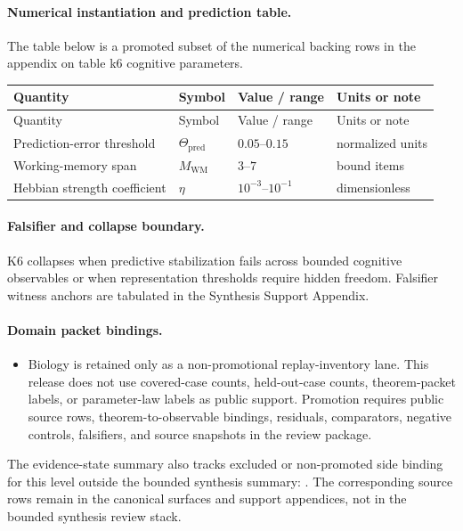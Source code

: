 \paragraph{Numerical instantiation and prediction table.}
The table below is a promoted subset of the numerical backing rows in the appendix on table k6 cognitive parameters.
\begin{longtable}{@{}L{0.27\textwidth}L{0.15\textwidth}L{0.24\textwidth}L{0.16\textwidth}@{}}
\toprule
Quantity & Symbol & Value / range & Units or note \\
\midrule
\endfirsthead
\toprule
Quantity & Symbol & Value / range & Units or note \\
\midrule
\endhead
Prediction-error threshold & $\scriptstyle \Theta_{\mathrm{pred}}$ & $0.05\text{--}0.15$ & normalized units \\
Working-memory span & $\scriptstyle M_{\mathrm{WM}}$ & $3\text{--}7$ & bound items \\
Hebbian strength coefficient & $\scriptstyle \eta$ & $10^{-3}\text{--}10^{-1}$ & dimensionless \\
\bottomrule
\end{longtable}

\paragraph{Falsifier and collapse boundary.}
K6 collapses when predictive stabilization fails across bounded cognitive observables or when representation thresholds require hidden freedom.
Falsifier witness anchors are tabulated in the Synthesis Support Appendix.

\paragraph{Domain packet bindings.}
\begin{itemize}[leftmargin=1.6em,nosep]
\item Biology is retained only as a non-promotional replay-inventory lane. This release does not use covered-case counts, held-out-case counts, theorem-packet labels, or parameter-law labels as public support. Promotion requires public source rows, theorem-to-observable bindings, residuals, comparators, negative controls, falsifiers, and source snapshots in the review package.
\end{itemize}
The evidence-state summary also tracks  excluded or non-promoted side binding for this level outside the bounded synthesis summary: . The corresponding source rows remain in the canonical surfaces and support appendices, not in the bounded synthesis review stack.

